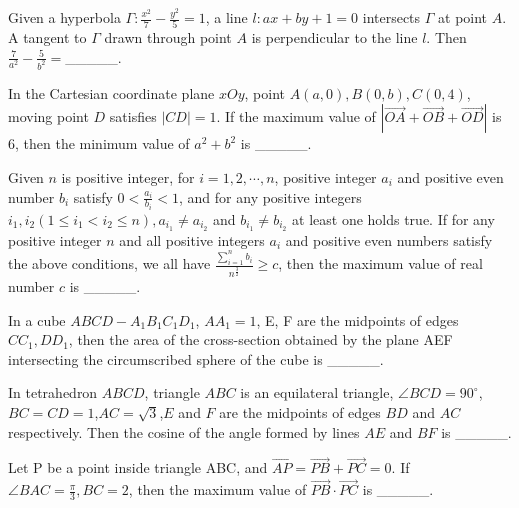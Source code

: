 \begin{problem}\label{AI-Algebra38}
Given a hyperbola $\Gamma: \frac{x^{2}}{7}-\frac{y^{2}}{5}=1$, a line $l: a x+b y+1=0$ intersects $\Gamma$ at point $A$. A tangent to $\Gamma$ drawn through point $A$ is perpendicular to the line $l$. Then $\frac{7}{a^{2}}-\frac{5}{b^{2}}=$\_\_\_\_\_.
\end{problem}


\begin{problem}\label{AI-Algebra39}
In the Cartesian coordinate plane $x O y$, point $A(a, 0), B(0, b), C(0,4)$, moving point $D$ satisfies $|C D|=1$. If  the maximum value of $|\overrightarrow{O A}+\overrightarrow{O B}+\overrightarrow{O D}|$ is 6, then the minimum value of $a^{2}+b^{2}$ is \_\_\_\_\_.
\end{problem}

\begin{problem}\label{AI-Algebra40}
Given $n$ is positive integer, for $i=1,2, \cdots, n$, positive integer $a_{i}$ and positive even number $b_{i}$ satisfy $0<\frac{a_{i}}{b_{i}}<1$, and for any positive integers $i_{1}, i_{2}\left(1 \leq i_{1}<i_{2} \leq n\right), a_{i_{1}} \neq a_{i_{2}}$ and $b_{i_{1}} \neq b_{i_{2}}$ at least one holds true. If for any positive integer $n$ and all positive integers $a_{i}$ and positive even numbers satisfy the above conditions, we all have $\frac{\sum_{i=1}^{n} b_{i}}{n^{\frac{3}{2}}} \geq c$, then the maximum value of real number $c$ is \_\_\_\_\_.

\end{problem}


\begin{problem}\label{AlChallenge_Geo1}
In a cube $ABCD-A_1B_1C_1D_1$, $AA_1=1$, E, F are the midpoints of edges $CC_1, DD_1$, then the area of the cross-section obtained by the plane AEF intersecting the circumscribed sphere of the cube is \_\_\_\_\_.
\end{problem}



\begin{problem}\label{AIChallenge_Geo2}
In tetrahedron $ABCD$, triangle $ABC$ is an equilateral triangle, $\angle BCD=90^{\circ}$, $BC=CD=1$,$AC=\sqrt{3}$,$E$ and $F$ are the midpoints of edges $BD$ and $AC$ respectively. Then the cosine of the angle formed by lines $AE$ and $BF$ is \_\_\_\_\_.
\end{problem}


\begin{problem}\label{AIChallenge_Geo3} 
Let P be a point inside triangle ABC, and $\overrightarrow{AP} = \overrightarrow{PB} + \overrightarrow{PC}=0$. If $\angle BAC = \frac{\pi}{3}, BC=2$, then the maximum value of $\overrightarrow{PB}\cdot\overrightarrow{PC}$ is \_\_\_\_\_.
\end{problem}


